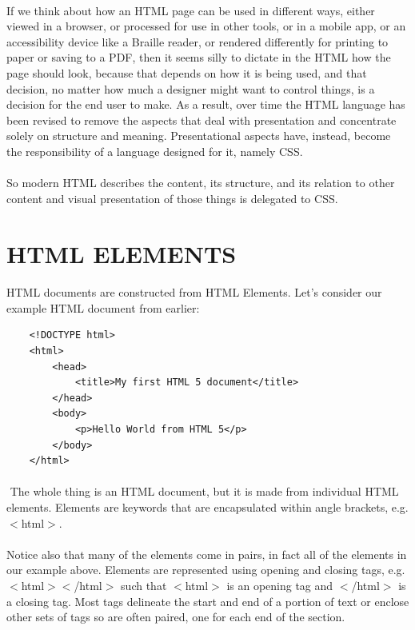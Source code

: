 \paragraph{} If we think about how an HTML page can be used in different ways, either viewed in a browser, or processed for use in other tools, or in a mobile app, or an accessibility device like a Braille reader, or rendered differently for printing to paper or saving to a PDF, then it seems silly to dictate in the HTML how the page should look, because that depends on how it is being used, and that decision, no matter how much a designer might want to control things, is a decision for the end user to make. As a result, over time the HTML language has been revised to remove the aspects that deal with presentation and concentrate solely on structure and meaning. Presentational aspects have, instead, become the responsibility of a language designed for it, namely CSS.
\paragraph{} So modern HTML describes the content, its structure, and its relation to other content and visual presentation of those things is delegated to CSS.


\section{HTML ELEMENTS}
\paragraph{} HTML documents are constructed from HTML Elements. Let's consider our example HTML document from earlier:
\begin{lstlisting}
	<!DOCTYPE html>
	<html>
		<head>
			<title>My first HTML 5 document</title>
		</head>
		<body>
			<p>Hello World from HTML 5</p>
		</body>
	</html> 
\end{lstlisting}
\paragraph{} The whole thing is an HTML document, but it is made from individual HTML elements. Elements are keywords that are encapsulated within angle brackets, e.g. $<$html$>$. 
\paragraph{} Notice also that many of the elements come in pairs, in fact all of the elements in our example above. Elements are represented using opening and closing tags, e.g. $<$html$>$$<$/html$>$  such that $<$html$>$ is an opening tag and $<$/html$>$ is a closing tag. Most tags delineate the start and end of a portion of text or enclose other sets of tags so are often paired, one for each end of the section.  
